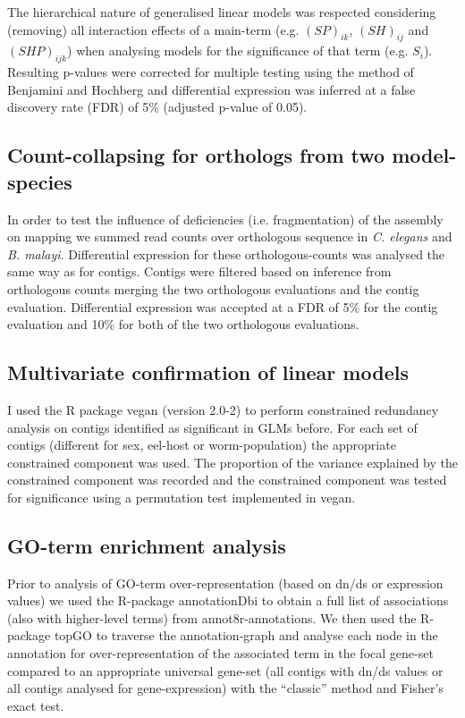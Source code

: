 \documentclass[10pt]{article}
\begin{document}
The hierarchical nature of generalised linear models was respected
considering (removing) all interaction effects of a main-term
(e.g. $(SP)_{ik}$, $(SH)_{ij}$ and $(SHP)_{ijk}$) when analysing
models for the significance of that term (e.g. $S_i$). Resulting
p-values were corrected for multiple testing using the method of
Benjamini and Hochberg \cite{benjamini1995controlling} and
differential expression was inferred at a false discovery rate (FDR)
of 5\% (adjusted p-value of 0.05).

\subsection{Count-collapsing for orthologs from two model-species}
\label{collapse}

In order to test the influence of deficiencies (i.e. fragmentation) of
the assembly on mapping we summed read counts over orthologous
sequence in \textit{C. elegans} and \textit{B. malayi}.  Differential
expression for these orthologous-counts was analysed the same way as
for contigs. Contigs were filtered based on inference from orthologous
counts merging the two orthologous evaluations and the contig
evaluation. Differential expression was accepted at a FDR of 5\% for
the contig evaluation and 10\% for both of the two orthologous
evaluations.

\subsection{Multivariate confirmation of linear models}

I used the R package vegan (version 2.0-2) to perform constrained
redundancy analysis on contigs identified as significant in GLMs
before. For each set of contigs (different for sex, eel-host or
worm-population) the appropriate constrained component was used. The
proportion of the variance explained by the constrained component was
recorded and the constrained component was tested for significance
using a permutation test implemented in vegan.

\subsection{GO-term enrichment analysis}

Prior to analysis of GO-term over-representation (based on dn/ds or
expression values) we used the R-package annotationDbi
\cite{AnnotationDbi} to obtain a full list of associations (also with
higher-level terms) from annot8r-annotations. We then used the
R-package topGO \cite{topGO} to traverse the annotation-graph and
analyse each node in the annotation for over-representation of the
associated term in the focal gene-set compared to an appropriate
universal gene-set (all contigs with dn/ds values or all contigs
analysed for gene-expression) with the ``classic'' method and Fisher's
exact test.
\end{document}
